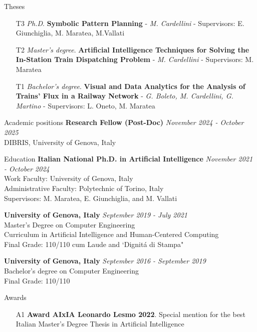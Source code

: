 \documentclass{resume} %
\begin{document}
\begin{rSection}{Theses}

\begin{enumerate}[leftmargin=5mm]
\item[T3] \textit{Ph.D}. \textbf{Symbolic Pattern Planning} - \textit{M. Cardellini} - Supervisors: E. Giunchiglia, M. Maratea, M.Vallati
\item[T2] \textit{Master's degree}. \textbf{Artificial Intelligence Techniques for Solving the In-Station
Train Dispatching Problem} - \textit{M. Cardellini} - Supervisors: M. Maratea
\item[T1] \textit{Bachelor's degree}. \textbf{Visual and Data Analytics for the Analysis of Trains' Flux in a Railway Network} - \textit{G. Boleto, M. Cardellini, G. Martino} - Supervisors: L. Oneto, M. Maratea
\end{enumerate}
\end{rSection}


\begin{rSection}{Academic positions}
{\bf  Research Fellow (Post-Doc)} \hfill {\em November 2024 - \textit{October 2025}} \\ 
DIBRIS, University of Genova, Italy
\end{rSection}


\begin{rSection}{Education}
{\bf  Italian National Ph.D. in Artificial Intelligence} \hfill {\em November 2021 - \textit{October 2024}} \\ 
Work Faculty: University of Genova, Italy\\
Administrative Faculty: Polytechnic of Torino, Italy\\
Supervisors: M. Maratea, E. Giunchiglia, and M. Vallati

{\bf University of Genova, Italy} \hfill {\em September 2019 - July 2021} \\ 
Master's Degree on Computer Engineering \\
Curriculum in Artificial Intelligence and Human-Centered Computing \\
Final Grade: 110/110 cum Laude and `Dignit\'a di Stampa" 

{\bf University of Genova, Italy} \hfill {\em September 2016 - September 2019} \\ 
Bachelor's degree on Computer Engineering \\
Final Grade: 110/110 
\end{rSection}
\begin{rSection}{Awards}
\begin{enumerate}[leftmargin=5mm]
	\item[A1] \textbf{Award AIxIA Leonardo Lesmo 2022}. Special mention for the best Italian Master's Degree Thesis in Artificial Intelligence
\end{enumerate}
\end{rSection}
\end{document}
